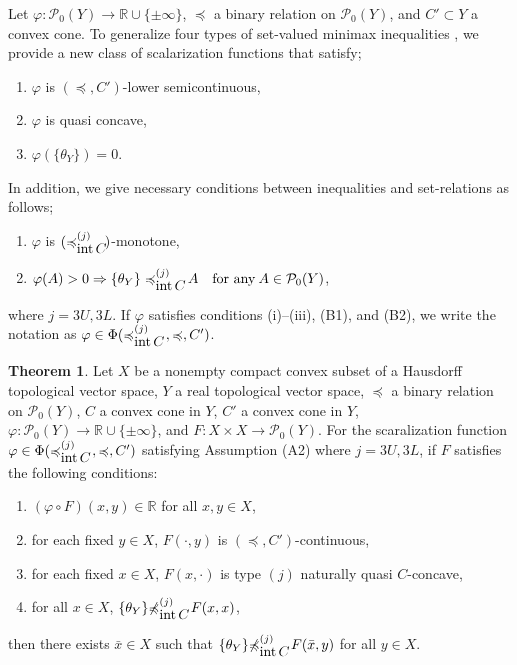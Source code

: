 \documentclass[a4paper,11pt]{jsarticle}
\theoremstyle{definition}
\newtheorem{thm}[dfn]{Theorem}
\newcommand{\rnum}{\mathbb{R}}
\newcommand{\Interior}[1]{\mbox{\rm int}\mbox{$\,#1$}}
\newcommand{\pow}[1]{\mathcal{P}_{0}(#1)}
\newcommand{\setrel}[2]{\preccurlyeq^{(#1)}_{#2}\!}
\newcommand{\notsetrel}[2]{{\not\preccurlyeq}^{(#1)}_{#2}\!}
\begin{document}
Let $\varphi: \pow{Y} \to \rnum \cup \{\pm \infty\}$, $\preccurlyeq$ a binary relation
on $\pow{Y}$, and $C' \subset Y$  a convex cone.
To generalize four types of set-valued minimax inequalities \cite{KuwanoTanakaYamada2010},
we provide a new class of scalarization functions that satisfy;
\begin{enumerate}
  \item $\varphi$ is $(\preccurlyeq, C')$-lower semicontinuous,
  \item $\varphi$ is quasi concave,
  \item $\varphi(\{\theta_{Y}\}) = 0$.
\end{enumerate}
In addition, we give necessary conditions between inequalities and set-relations as follows;
\begin{enumerate}[label=(B\arabic*)]
  \item $\varphi$ is $(\setrel{j}{\Interior{C}})$-monotone,
  \item $\varphi (A) > 0 \Rightarrow  \{\theta_Y\} \setrel{j}{\Interior{C}} A \quad\text{for any}\:A\in \pow{Y}$,
\end{enumerate}
where $j= 3U, 3L$.
If $\varphi$ satisfies conditions (i)--(iii), (B1), and (B2),
we write the notation as $\varphi \in \Phi(\setrel{j}{\Interior{C}}\:, \preccurlyeq, C')$.

\begin{thm}\label{NewSetValuedFanTakahashiMinimaxInequalitiesType2}
  Let $X$ be a nonempty compact convex subset of a Hausdorff topological vector space,
  $Y$ a real topological vector space, $\preccurlyeq$ a binary relation on $\pow{Y}$,
  $C$ a convex cone in $Y$, $C'$ a convex cone in $Y$,
  $\varphi\colon \pow{Y} \to \rnum \cup \{\pm \infty\}$,
  and $F\colon X \times X \to \pow{Y}$.
  For the scaralization function $\varphi \in \Phi(\setrel{j}{\Interior{C}}\:, \preccurlyeq, C')$
  satisfying Assumption (A2) where $j= 3U, 3L$,
  if $F$ satisfies the following conditions:
  \begin{enumerate}
    \item $(\varphi \circ F)(x,y) \in \rnum$ for all $x,y \in X$,
    \item for each fixed $y \in X$, $F(\cdot,y)$ is $(\preccurlyeq, C')$-continuous,
    \item for each fixed $x \in X$, $F(x,\cdot)$ is type $(j)$ naturally quasi $C$-concave,
    \item for all $x \in X$, $\{\theta_Y\} \notsetrel{j}{\Interior{C}}\: F(x,x) $,
  \end{enumerate}
  then there exists $\bar{x} \in X$ such that $\{\theta_Y\} \notsetrel{j}{\Interior{C}}\: F(\bar{x},y)$
  for all $y \in X$.
\end{thm}
\end{document}
